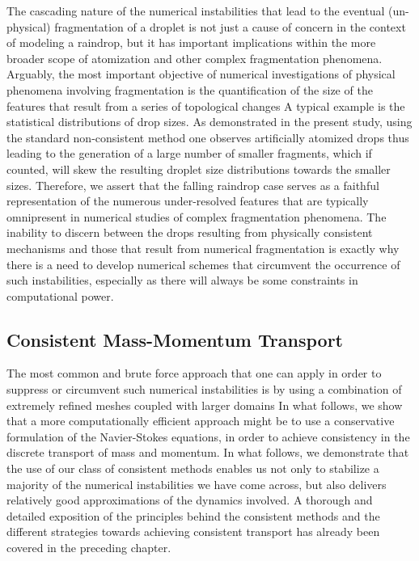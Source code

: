 The cascading nature of the numerical instabilities that lead to 
the eventual (un-physical) fragmentation of a droplet is not just a 
cause of concern in the context of modeling a raindrop, but it has important
implications within the more broader scope of 
atomization and other complex fragmentation phenomena. 
Arguably, the most important objective of numerical investigations of physical
phenomena involving fragmentation is the quantification of the size of 
the features that result from a series of topological changes 
A typical example is the statistical distributions of drop sizes. 
As demonstrated in the present study, using the standard non-consistent method  
one observes artificially atomized drops thus leading to the generation of a large number of 
smaller fragments, which if counted, will skew the resulting droplet size 
distributions towards the smaller sizes.
Therefore, we assert that the falling raindrop case serves as a faithful representation of the 
numerous under-resolved features that are typically omnipresent in
numerical studies of complex fragmentation phenomena.  
The inability to discern between the drops resulting from physically consistent 
mechanisms and those that result from numerical fragmentation is exactly
why there is a need to develop numerical schemes that circumvent the occurrence
of such instabilities, especially as there will always be some constraints in computational power.  


\subsection*{Consistent Mass-Momentum Transport}

The most common and brute force approach that one can apply 
in order to suppress or circumvent such numerical instabilities is 
by using a combination of extremely refined meshes coupled with larger domains
In what follows, we show that a more computationally efficient approach might be to use a 
conservative formulation
of the Navier-Stokes equations, in order
to achieve consistency in the discrete transport of mass and momentum. 
In what follows, we demonstrate that the use of our class of consistent methods 
enables us not only to stabilize a majority of the numerical
instabilities we have come across, but also delivers relatively good approximations 
of the dynamics involved. A thorough and detailed exposition of the principles
behind the consistent methods and the different strategies towards achieving consistent
transport has already been covered in the preceding chapter.  

